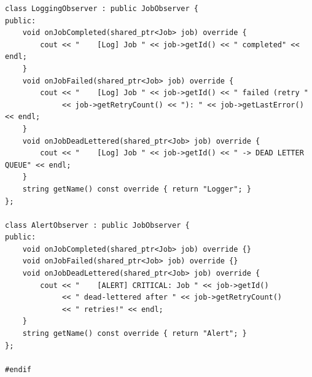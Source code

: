 \documentclass[11pt,a4paper]{article}
\begin{document}
\begin{lstlisting}[title={\texttt{strategies.hpp}}]
class LoggingObserver : public JobObserver {
public:
    void onJobCompleted(shared_ptr<Job> job) override {
        cout << "    [Log] Job " << job->getId() << " completed" << endl;
    }
    void onJobFailed(shared_ptr<Job> job) override {
        cout << "    [Log] Job " << job->getId() << " failed (retry "
             << job->getRetryCount() << "): " << job->getLastError() << endl;
    }
    void onJobDeadLettered(shared_ptr<Job> job) override {
        cout << "    [Log] Job " << job->getId() << " -> DEAD LETTER QUEUE" << endl;
    }
    string getName() const override { return "Logger"; }
};

class AlertObserver : public JobObserver {
public:
    void onJobCompleted(shared_ptr<Job> job) override {}
    void onJobFailed(shared_ptr<Job> job) override {}
    void onJobDeadLettered(shared_ptr<Job> job) override {
        cout << "    [ALERT] CRITICAL: Job " << job->getId()
             << " dead-lettered after " << job->getRetryCount()
             << " retries!" << endl;
    }
    string getName() const override { return "Alert"; }
};

#endif
\end{lstlisting}

\newpage
\end{document}
